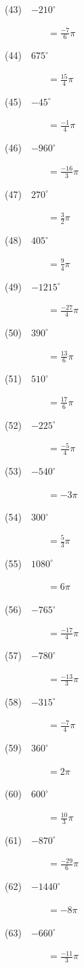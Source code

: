 \documentclass[a4j,twocolumn,10pt,fleqn]{jarticle}
\begin{document}
(43)~~$-210^\circ$

~~~~~~~~~$=\frac{-7}{6}\pi$

(44)~~$675^\circ$

~~~~~~~~~$=\frac{15}{4}\pi$

(45)~~$-45^\circ$

~~~~~~~~~$=\frac{-1}{4}\pi$

(46)~~$-960^\circ$

~~~~~~~~~$=\frac{-16}{3}\pi$

(47)~~$270^\circ$

~~~~~~~~~$=\frac{3}{2}\pi$

(48)~~$405^\circ$

~~~~~~~~~$=\frac{9}{4}\pi$

(49)~~$-1215^\circ$

~~~~~~~~~$=\frac{-27}{4}\pi$

(50)~~$390^\circ$

~~~~~~~~~$=\frac{13}{6}\pi$

(51)~~$510^\circ$

~~~~~~~~~$=\frac{17}{6}\pi$

(52)~~$-225^\circ$

~~~~~~~~~$=\frac{-5}{4}\pi$

(53)~~$-540^\circ$

~~~~~~~~~$=-3\pi$

(54)~~$300^\circ$

~~~~~~~~~$=\frac{5}{3}\pi$

(55)~~$1080^\circ$

~~~~~~~~~$=6\pi$

(56)~~$-765^\circ$

~~~~~~~~~$=\frac{-17}{4}\pi$

(57)~~$-780^\circ$

~~~~~~~~~$=\frac{-13}{3}\pi$

(58)~~$-315^\circ$

~~~~~~~~~$=\frac{-7}{4}\pi$

(59)~~$360^\circ$

~~~~~~~~~$=2\pi$

(60)~~$600^\circ$

~~~~~~~~~$=\frac{10}{3}\pi$

(61)~~$-870^\circ$

~~~~~~~~~$=\frac{-29}{6}\pi$

(62)~~$-1440^\circ$

~~~~~~~~~$=-8\pi$

(63)~~$-660^\circ$

~~~~~~~~~$=\frac{-11}{3}\pi$
\end{document}
